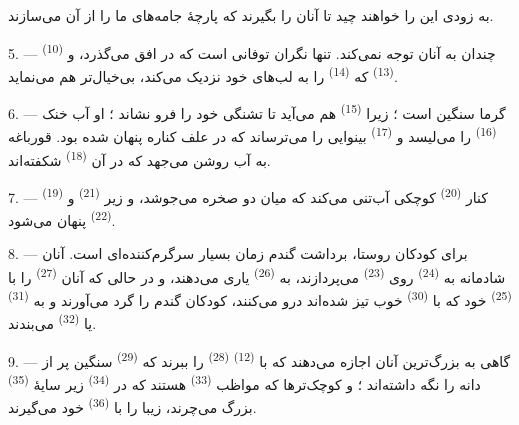 به زودی این  را خواهند چید تا  آنان را
بگیرند که پارچهٔ جامه‌های ما را از آن می‌سازند.

\VUsaut{5.0mm}
\VUsaut{3.4mm}

5. ---  \textsuperscript{(10)} چندان به آنان توجه
نمی‌کند. تنها نگران توفانی است که در افق می‌گذرد، و 
\textsuperscript{(13)} که  \textsuperscript{(14)} را به
لب‌های خود نزدیک می‌کند، بی‌خیال‌تر هم می‌نماید.

6. --- گرما سنگین است ؛ زیرا  \textsuperscript{(15)} هم
می‌آید تا تشنگی خود را فرو نشاند ؛ او آب خنک 
\textsuperscript{(16)} را می‌لیسد و 
\textsuperscript{(17)} بینوایی را می‌ترساند که در علف کناره پنهان شده
بود. قورباغه به آب روشن می‌جهد که در آن 
\textsuperscript{(18)} شکفته‌اند.

7. ---  \textsuperscript{(19)} کنار 
\textsuperscript{(20)} کوچکی آب‌تنی می‌کند که میان دو صخره می‌جوشد، و
زیر  \textsuperscript{(21)} و  \textsuperscript{(22)} پنهان می‌شود.

\VUsaut{5.0mm}
\VUsaut{3.4mm}

8. --- برای کودکان روستا، برداشت گندم زمان بسیار سرگرم‌کننده‌ای است.
آنان شادمانه به  \textsuperscript{(24)} روی
 \textsuperscript{(23)} می‌پردازند، به 
\textsuperscript{(26)} یاری می‌دهند، و در حالی که آنان  \textsuperscript{(27)} را با 
\textsuperscript{(25)} خود که با 
\textsuperscript{(30)} خوب تیز شده‌اند درو می‌کنند، کودکان گندم را گرد
می‌آورند و به  \textsuperscript{(31)} یا  \textsuperscript{(32)} می‌بندند.

9. --- گاهی به بزرگ‌ترین آنان اجازه می‌دهند که با  \textsuperscript{(12)} 
\textsuperscript{(28)} را ببرند که 
\textsuperscript{(29)} سنگین پر از دانه را نگه داشته‌اند ؛ و کوچک‌ترها
که مواظب  \textsuperscript{(33)} هستند که در
 \textsuperscript{(34)} زیر سایهٔ 
\textsuperscript{(35)} بزرگ می‌چرند،  زیبا را با
 \textsuperscript{(36)} خود می‌گیرند.

